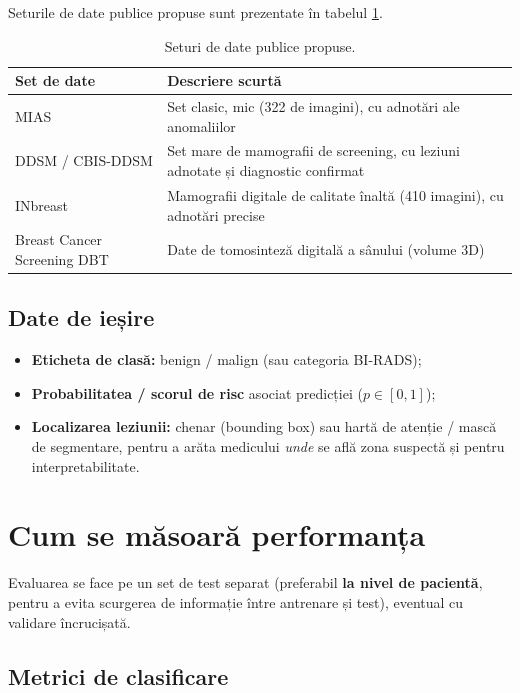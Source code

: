 \documentclass[runningheads,a4paper,11pt]{report}
\begin{document}
Seturile de date publice propuse sunt prezentate în tabelul \ref{tab:datasets}.

\begin{table}[htbp]
	\caption{Seturi de date publice propuse.}
	\label{tab:datasets}
	\begin{center}
		\begin{tabular}{p{4.5cm}p{10.5cm}}
			\textbf{Set de date} & \textbf{Descriere scurtă} \\
			\hline\hline
			MIAS & Set clasic, mic (322 de imagini), cu adnotări ale anomaliilor \\
			DDSM / CBIS-DDSM & Set mare de mamografii de screening, cu leziuni adnotate și diagnostic confirmat \\
			INbreast & Mamografii digitale de calitate înaltă (410 imagini), cu adnotări precise \\
			Breast Cancer Screening DBT & Date de tomosinteză digitală a sânului (volume 3D) \\
		\end{tabular}
	\end{center}
\end{table}

\subsection{Date de ieșire}

\begin{itemize}
	\item \textbf{Eticheta de clasă:} benign / malign (sau categoria BI-RADS);
	\item \textbf{Probabilitatea / scorul de risc} asociat predicției ($p \in [0,1]$);
	\item \textbf{Localizarea leziunii:} chenar (bounding box) sau hartă de atenție / mască de segmentare, pentru a arăta medicului \emph{unde} se află zona suspectă și pentru interpretabilitate.
\end{itemize}

\section{Cum se măsoară performanța}
\label{section:performance}

Evaluarea se face pe un set de test separat (preferabil \textbf{la nivel de pacientă}, pentru a evita scurgerea de informație între antrenare și test), eventual cu validare încrucișată.

\subsection{Metrici de clasificare}
\end{document}
